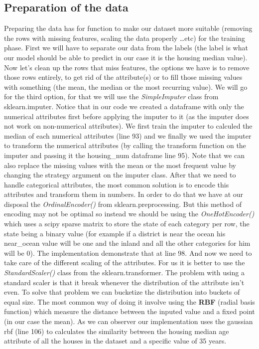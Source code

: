 \documentclass{article}
\begin{document}
\subsection{Preparation of the data}
Preparing the data has for function to make our dataset more suitable (removing the rows with missing features, scaling the data properly \ldots etc)
for the training phase. First we will have to separate our data from the labels (the label is what our model should be able to predict in our case it is the housing median value).
Now let's clean up the rows that miss features, the options we have is to remove those rows entirely, to get rid of the attribute(s) or to fill those
missing values with something (the mean, the median or the most recurring value). We will go for the third option, for that we will use the 
\textit{SimpleImputer} class from sklearn.imputer. Notice that in our code we created a dataframe with only the numerical attributes first before
applying the imputer to it (as the imputer does not work on non-numerical attributes). We first train the imputer to calculed the median of
each numerical attributes (line 93) and we finally we used the imputer to transform the numerical attributes (by calling the transform function on the imputer
and passing it the housing\_num dataframe \- line 95). Note that we can also replace the missing values with the mean or the most frequent value
by changing the strategy argument on the imputer class. After that we need to handle categorical attributes, the most common solution is to
encode this attributes and transform them in numbers. In order to do that we have at our disposal the \textit{OrdinalEncoder()} from sklearn.preprocessing. But this method of
encoding may not be optimal so instead we should be using the \textit{OneHotEncoder()} which uses a scipy sparse matrix to store the state of
each category per row, the state being a binary value (for example if a district is near the ocean his near\_ocean value will be one and the inland and all
the other categories for him will be 0). The implementation demonstrate that at line 98. And now we need to take care of the different scaling
of the attributes. For us it is better to use the \textit{StandardScaler()} class from the sklearn.transformer. The problem with using a standard scaler is that
it break whenever the distribution of the attribute isn't even. To solve that problem we can bucketize the distribution into buckets of equal size.
The most common way of doing it involve using the \textbf{RBF} (radial basis function) which measure the distance between the inputed value and a
fixed point (in our case the mean). As we can observer our implementation uses the gaussian rbf (line 106) to calculates the similarity between 
the housing median age attribute of all the houses in the dataset and a specific value of 35 years.
\end{document}
